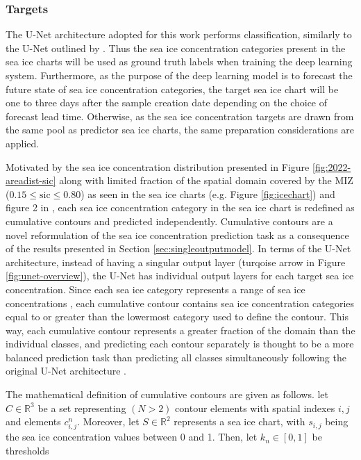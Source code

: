 \documentclass[../main/thesis]{subfiles}
\begin{document}
\subsubsection{Targets}
\label{sec:data_targets}
The U-Net architecture adopted for this work performs classification, similarly to the U-Net outlined by \citet{Ronneberger2015}. Thus the sea ice concentration categories present in the sea ice charts \citep{Dinessen2020} will be used as ground truth labels when training the deep learning system. Furthermore, as the purpose of the deep learning model is to forecast the future state of sea ice concentration categories, the target sea ice chart will be one to three days after the sample creation date depending on the choice of forecast lead time. Otherwise, as the sea ice concentration targets are drawn from the same pool as predictor sea ice charts, the same preparation considerations are applied.

Motivated by the sea ice concentration distribution presented in Figure \ref{fig:2022-areadist-sic} along with limited fraction of the spatial domain covered by the MIZ ($0.15 \leq \text{sic} \leq 0.80$) as seen in the sea ice charts (e.g. Figure \ref{fig:icechart}) and figure 2 in \citet{Strong2012}, each sea ice concentration category in the sea ice chart is redefined as cumulative contours and predicted independently. Cumulative contours are a novel reformulation of the sea ice concentration prediction task as a consequence of the results presented in Section \ref{sec:singleoutputmodel}. In terms of the U-Net architecture, instead of having a singular output layer (turqoise arrow in Figure \ref{fig:unet-overview}), the U-Net has individual output layers for each target sea ice concentration. Since each sea ice category represents a range of sea ice concentrations \citep{Dinessen2020}, each cumulative contour contains sea ice concentration categories equal to or greater than the lowermost category used to define the contour. This way, each cumulative contour represents a greater fraction of the domain than the individual classes, and predicting each contour separately is thought to be a more balanced prediction task than predicting all classes simultaneously following the original U-Net architecture \citep{Ronneberger2015}.

The mathematical definition of cumulative contours are given as follows. let $C \in \mathbb{R}^3$ be a set representing $(N > 2)$ contour elements with spatial indexes $i,j$ and elements $c_{i,j}^n$. Moreover, let $S \in \mathbb{R}^2$ represents a sea ice chart, with $s_{i,j}$ being the sea ice concentration values between 0 and 1. Then, let $k_n \in [0,1]$ be thresholds 
\end{document}

